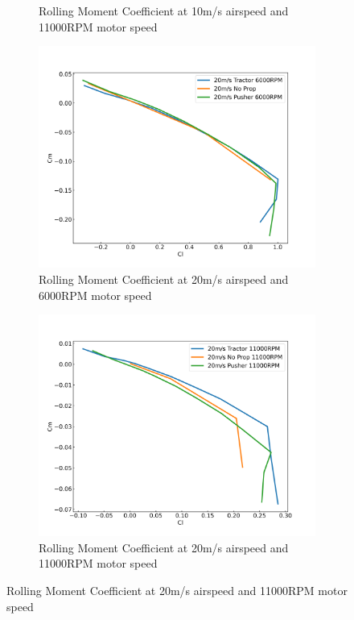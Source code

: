 \begin{figure}[H]
\begin{subfigure}[b]{0.467\textwidth}
        \caption{Rolling Moment Coefficient at 10m/s airspeed and 11000RPM motor speed}
        \label{fig:CmCl_10ms_11000}
    \end{subfigure}
    \begin{subfigure}[b]{0.467\textwidth}
        \centering
        \includegraphics[width=\textwidth]{05_Results/Figs/ClCm/20ms_6000RPM_CmCl.png}
        \caption{Rolling Moment Coefficient at 20m/s airspeed and 6000RPM motor speed}
        \label{fig:CmCl_20ms_6000}
    \end{subfigure}
    \begin{subfigure}[b]{0.467\textwidth}
        \centering
        \includegraphics[width=\textwidth]{05_Results/Figs/ClCm/20ms_11000RPM_CmCl.png}
        \caption{Rolling Moment Coefficient at 20m/s airspeed and 11000RPM motor speed}
        \label{fig:CmCl_20ms_11000}
    \end{subfigure}
\end{figure}


